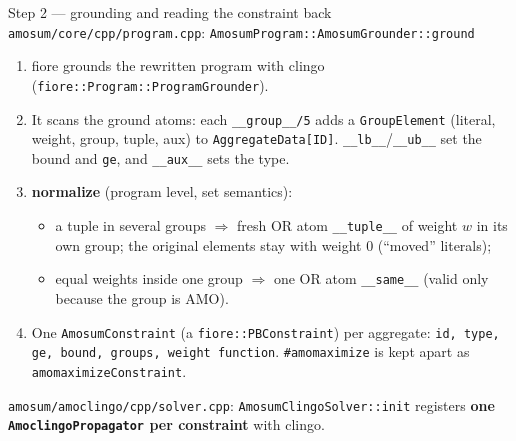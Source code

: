 \documentclass[aspectratio=169,11pt]{beamer}
\newcommand{\file}[1]{{\small\texttt{\color{acc}#1}}}
\begin{document}
\begin{frame}{Step 2 --- grounding and reading the constraint back}
\footnotesize
\file{amosum/core/cpp/program.cpp}: \texttt{AmosumProgram::AmosumGrounder::ground}
\begin{enumerate}\setlength\itemsep{2pt}
\item fiore grounds the rewritten program with clingo (\texttt{fiore::Program::ProgramGrounder}).
\item It scans the ground atoms: each \texttt{\_\_group\_\_/5} adds a \texttt{GroupElement} (literal, weight, group, tuple, aux)
  to \texttt{AggregateData[ID]}. \texttt{\_\_lb\_\_}/\texttt{\_\_ub\_\_} set the bound and \texttt{ge}, and \texttt{\_\_aux\_\_} sets the type.
\item \textbf{normalize} (program level, set semantics):
  \begin{itemize}\setlength\itemsep{0pt}
  \item a tuple in several groups $\Rightarrow$ fresh OR atom \texttt{\_\_tuple\_\_} of weight $w$ in its own group;
    the original elements stay with weight 0 (``moved'' literals);
  \item equal weights inside one group $\Rightarrow$ one OR atom \texttt{\_\_same\_\_} (valid only because the group is AMO).
  \end{itemize}
\item One \texttt{AmosumConstraint} (a \texttt{fiore::PBConstraint}) per aggregate: \texttt{id, type, ge, bound, groups,
  weight function}. \texttt{\#amomaximize} is kept apart as \texttt{amomaximizeConstraint}.
\end{enumerate}
\vspace{1mm}
\file{amosum/amoclingo/cpp/solver.cpp}: \texttt{AmosumClingoSolver::init} registers
\textbf{one \texttt{AmoclingoPropagator} per constraint} with clingo.
\end{frame}
\end{document}

